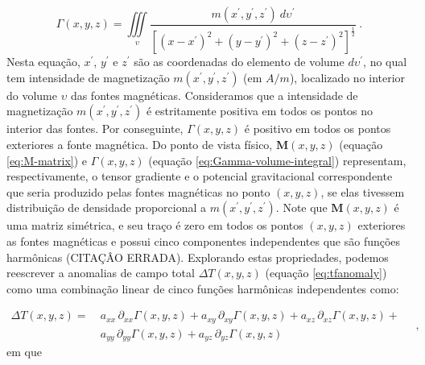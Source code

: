 \begin{equation}
\Gamma(x, y, z) = \iiint\limits_{\upsilon} 
\frac{m(x^{\prime}, y^{\prime}, z^{\prime}) \: d\upsilon^{\prime}}
{\left[ (x-x^{\prime})^2 + (y-y^{\prime})^2 + (z-z^{\prime})^2 \right]^{\frac{1}{2}}} \: .
\label{eq:Gamma-volume-integral}
\end{equation}
Nesta equação, $x^{\prime}$, $y^{\prime}$ e $z^{\prime}$ são as coordenadas do elemento de volume $d \upsilon^{\prime}$, no qual tem intensidade de magnetização $m(x^{\prime}, y^{\prime}, z^{\prime})$ (em $A/m$), localizado no interior do volume $\upsilon$ das fontes magnéticas. Consideramos que a intensidade de magnetização $m(x^{\prime}, y^{\prime}, z^{\prime})$ é estritamente positiva em todos os pontos no interior das fontes. Por conseguinte, $\Gamma(x, y, z)$ é positivo em todos os pontos exteriores a fonte magnética. Do ponto de vista físico, $\mathbf{M}(x, y, z)$ (equação \ref{eq:M-matrix}) e $\Gamma(x, y, z)$ (equação \ref{eq:Gamma-volume-integral}) representam, respectivamente, o tensor gradiente e o potencial gravitacional correspondente que seria produzido pelas fontes magnéticas no ponto $(x,y,z)$, se elas tivessem distribuição de densidade proporcional a $m(x^{\prime}, y^{\prime}, z^{\prime})$. Note que $\mathbf{M}(x, y, z)$ é uma matriz simétrica, e seu traço é zero em todos os pontos $(x,y,z)$ exteriores as fontes magnéticas e possui cinco componentes independentes que são funções harmônicas \citep{pedersen1991} (CITAÇÂO ERRADA). Explorando estas propriedades, podemos reescrever a anomalias de campo total $\Delta T(x, y, z)$ (equação \ref{eq:tfanomaly}) como uma combinação linear de cinco funções harmônicas independentes como:  

\begin{equation}
	\begin{split}
		\Delta T(x, y, z) = \:
		& a_{xx} \, \partial_{xx} \Gamma(x, y, z) + 
		a_{xy} \, \partial_{xy} \Gamma(x, y, z) + 
		a_{xz} \, \partial_{xz} \Gamma(x, y, z) + \\
		& a_{yy} \, \partial_{yy} \Gamma(x, y, z) + 
		a_{yz} \, \partial_{yz} \Gamma(x, y, z)
	\end{split} \quad ,
	\label{eq:tfanomaly-alternative}
\end{equation}
em que 

